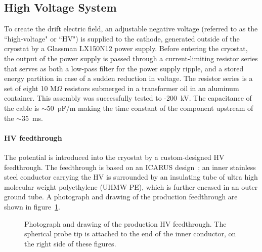 %
\subsection{High Voltage System}
\label{sec:hv}

To create the drift electric field, an adjustable negative voltage (referred to as the ``high-voltage" or ``HV") is supplied to the \lartpc cathode, generated outside of the cryostat by a Glassman LX150N12 power supply.  Before entering the cryostat, the output of the power supply is passed through a current-limiting resistor series that serves as both a low-pass filter for the power supply ripple, and a stored energy partition in case of a sudden reduction in voltage.  The resistor series is a set of eight 10 M$\Omega$ resistors submerged in a transformer oil in an aluminum container.  This assembly was successfully tested to -200~kV. The capacitance of the cable is $\sim$50~pF/m making the time constant of the component upstream of the \lartpc $\sim$35~ms.


\paragraph{HV feedthrough}
The potential is introduced into the cryostat by a custom-designed HV feedthrough.  The feedthrough is based on an ICARUS design~\cite{}; an inner stainless steel conductor carrying the HV is surrounded by an insulating tube of ultra high molecular weight polyethylene (UHMW PE), which is further encased in an outer ground tube.  A photograph and drawing of the production feedthrough are shown in figure~\ref{fig:hv_ftpic}.

\begin{figure}[htb]
\caption{Photograph and drawing of the production HV feedthrough. The spherical probe tip is attached to the end of the inner conductor, on the right side of these figures.}
\label{fig:hv_ftpic}
\end{figure}

